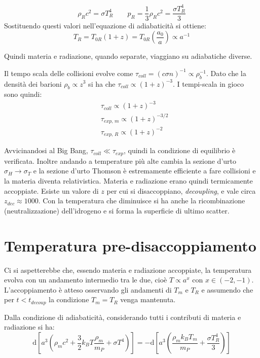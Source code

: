 $$
 \rho_R c^2 = \sigma T_R^4 \qquad p_R = \frac{1}{3}\rho_R c^2 = \frac{\sigma T_R^4}{3}
$$
Sostituendo questi valori nell'equazione di adiabaticità si ottiene:
\begin{equation}
    T_R = T_{0R} (1+z) = T_{0R}\left ( \frac{a_0}{a}\right )  \propto a^{-1}
\end{equation}

Quindi materia e radiazione, quando separate, viaggiano su adiabatiche diverse.




Il tempo scala delle collisioni evolve come $\tau_{coll}=(c\sigma n)^{-1} \propto \rho_b^{-1}$. Dato che la densità dei barioni $\rho_b \propto z^3$ si ha che $\tau_{coll}\propto (1+z)^{-3}$. I tempi-scala in gioco sono quindi:
\begin{align*}
    & \tau_{coll} \propto (1+z)^{-3} \\
    & \tau_{exp, \, m} \propto (1+z)^{-3/2} \\
    & \tau_{exp, \, R} \propto (1+z)^{-2}
\end{align*}

Avvicinandosi al Big Bang, $\tau_{coll}\ll \tau_{exp}$, quindi la condizione di equilibrio è verificata. Inoltre andando a temperature più alte cambia la sezione d'urto $\sigma_H \rightarrow \sigma_T$ e la sezione d'urto Thomson è estremamente efficiente a fare collisioni e la materia diventa relativistica. Materia e radiazione erano quindi termicamente accoppiate. Esiste un valore di $z$ per cui si disaccoppiano, \textit{decoupling}, e vale circa $z_{dec}\approx 1000$. Con la temperatura che diminuisce si ha anche la ricombinazione (neutralizzazione) dell'idrogeno e si forma la superficie di ultimo scatter.

\section{Temperatura pre-disaccoppiamento}
Ci si aspetterebbe che, essendo materia e radiazione accoppiate, la temperatura evolva con un andamento intermedio tra le due, cioè $T\propto a^x$ con $x\in (-2, -1)$. L'accoppiamento è atteso osservando gli andamenti di $T_m$ e $T_R$ e assumendo che per $t<t_{decoup}$ la condizione $T_m = T_R$ venga mantenuta. 

Dalla condizione di adiabaticità, considerando tutti i contributi di materia e radiazione si ha:
\begin{equation}
    \mathrm{d} \left [ a^3    \left( \rho_m c^2 + \frac{3}{2}k_B T \frac{\rho_m}{m_P} + \sigma T^4 \right)  \right] = - \mathrm{d} \left [ a^3    \left( \frac{\rho_m k_B T_m}{m_P} + \frac{\sigma T_R^4}{3}  \right)  \right]
\end{equation}


